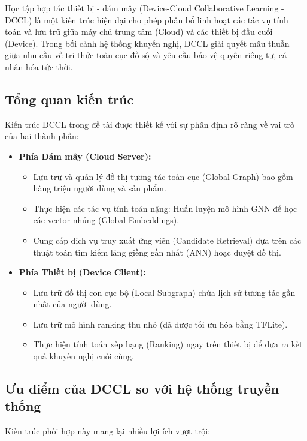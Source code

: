 Học tập hợp tác thiết bị - đám mây (Device-Cloud Collaborative Learning - DCCL) là một kiến trúc hiện đại cho phép phân bổ linh hoạt các tác vụ tính toán và lưu trữ giữa máy chủ trung tâm (Cloud) và các thiết bị đầu cuối (Device). Trong bối cảnh hệ thống khuyến nghị, DCCL giải quyết mâu thuẫn giữa nhu cầu về tri thức toàn cục đồ sộ và yêu cầu bảo vệ quyền riêng tư, cá nhân hóa tức thời.

\subsection{Tổng quan kiến trúc}

Kiến trúc DCCL trong đề tài được thiết kế với sự phân định rõ ràng về vai trò của hai thành phần:

\begin{itemize}
    \item \textbf{Phía Đám mây (Cloud Server):}
    \begin{itemize}
        \item Lưu trữ và quản lý đồ thị tương tác toàn cục (Global Graph) bao gồm hàng triệu người dùng và sản phẩm.
        \item Thực hiện các tác vụ tính toán nặng: Huấn luyện mô hình GNN để học các vector nhúng (Global Embeddings).
        \item Cung cấp dịch vụ truy xuất ứng viên (Candidate Retrieval) dựa trên các thuật toán tìm kiếm láng giềng gần nhất (ANN) hoặc duyệt đồ thị.
    \end{itemize}
    \item \textbf{Phía Thiết bị (Device Client):}
    \begin{itemize}
        \item Lưu trữ đồ thị con cục bộ (Local Subgraph) chứa lịch sử tương tác gần nhất của người dùng.
        \item Lưu trữ mô hình ranking thu nhỏ (đã được tối ưu hóa bằng TFLite).
        \item Thực hiện tính toán xếp hạng (Ranking) ngay trên thiết bị để đưa ra kết quả khuyến nghị cuối cùng.
    \end{itemize}
\end{itemize}

\subsection{Ưu điểm của DCCL so với hệ thống truyền thống}

Kiến trúc phối hợp này mang lại nhiều lợi ích vượt trội:

